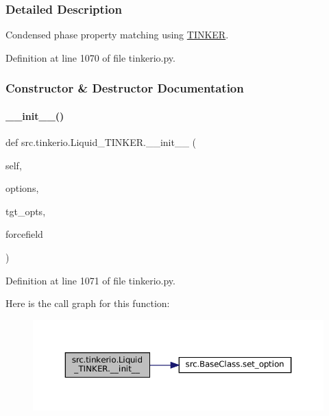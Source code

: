 \subsubsection{Detailed Description}
Condensed phase property matching using \hyperlink{classsrc_1_1tinkerio_1_1TINKER}{T\+I\+N\+K\+ER}. 



Definition at line 1070 of file tinkerio.\+py.



\subsubsection{Constructor \& Destructor Documentation}
\mbox{\label{classsrc_1_1tinkerio_1_1Liquid__TINKER_a4b4efabbcc7944031fd973d51bc1d68e}} 
\paragraph{\texorpdfstring{\+\_\+\+\_\+init\+\_\+\+\_\+()}{\_\_init\_\_()}}
{\footnotesize\ttfamily def src.\+tinkerio.\+Liquid\+\_\+\+T\+I\+N\+K\+E\+R.\+\_\+\+\_\+init\+\_\+\+\_\+ (\begin{DoxyParamCaption}\item[{}]{self,  }\item[{}]{options,  }\item[{}]{tgt\+\_\+opts,  }\item[{}]{forcefield }\end{DoxyParamCaption})}



Definition at line 1071 of file tinkerio.\+py.

Here is the call graph for this function\+:
\nopagebreak
\begin{figure}[H]
\begin{center}
\leavevmode
\includegraphics[width=350pt]{classsrc_1_1tinkerio_1_1Liquid__TINKER_a4b4efabbcc7944031fd973d51bc1d68e_cgraph}
\end{center}
\end{figure}


